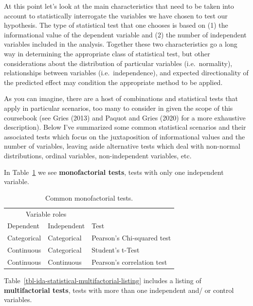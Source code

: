 \documentclass[
  letterpaper,
]{latex/krantz}
\begin{document}
At this point let's look at the main characteristics that need to be
taken into account to statistically interrogate the variables we have
chosen to test our hypothesis. The type of statistical test that one
chooses is based on (1) the informational value of the dependent
variable and (2) the number of independent variables included in the
analysis. Together these two characteristics go a long way in
determining the appropriate class of statistical test, but other
considerations about the distribution of particular variables
(i.e.~normality), relationships between variables (i.e.~independence),
and expected directionality of the predicted effect may condition the
appropriate method to be applied.

As you can imagine, there are a host of combinations and statistical
tests that apply in particular scenarios, too many to consider in given
the scope of this coursebook (see Gries (2013) and Paquot and Gries
(2020) for a more exhaustive description). Below I've summarized some
common statistical scenarios and their associated tests which focus on
the juxtaposition of informational values and the number of variables,
leaving aside alternative tests which deal with non-normal
distributions, ordinal variables, non-independent variables, etc.

In Table~\ref{tbl-ida-statistical-monofactorial-listing} we see
\textbf{monofactorial tests}, tests with only one independent variable.

\hypertarget{tbl-ida-statistical-monofactorial-listing}{}
\begin{table}
\caption{\label{tbl-ida-statistical-monofactorial-listing}Common monofactorial tests. }\tabularnewline

\centering
\begin{tabular}{lll}
\toprule
\multicolumn{2}{c}{Variable roles} & \multicolumn{1}{c}{ } \\
\cmidrule(l{3pt}r{3pt}){1-2}
Dependent & Independent & Test\\
\midrule
Categorical & Categorical & Pearson's Chi-squared test\\
Continuous & Categorical & Student's t-Test\\
Continuous & Continuous & Pearson's correlation test\\
\bottomrule
\end{tabular}
\end{table}

Table~\ref{tbl-ida-statistical-multifactorial-listing} includes a
listing of \textbf{multifactorial tests}, tests with more than one
independent and/ or control variables.
\end{document}
